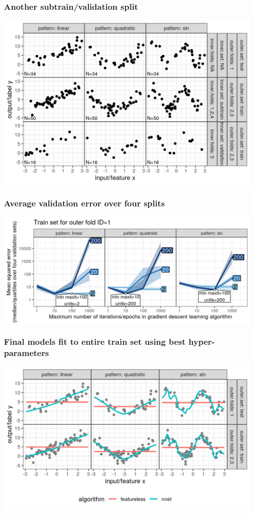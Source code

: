\documentclass{beamer}
\begin{document}
\begin{frame}
  \frametitle{Another subtrain/validation split}

  \includegraphics[width=\textwidth]{figure-overfitting-cv-data-inner-folds-1-3.png}
\end{frame}

\begin{frame}
  \frametitle{Average validation error over four splits}

  \includegraphics[width=\textwidth]{figure-overfitting-cv-data-median-mse-1.png}
\end{frame}

\begin{frame}
  \frametitle{Final models fit to entire train set using best hyper-parameters}

  \includegraphics[width=\textwidth]{figure-overfitting-cv-data-test-fold-1-pred.png}
\end{frame}
\end{document}

